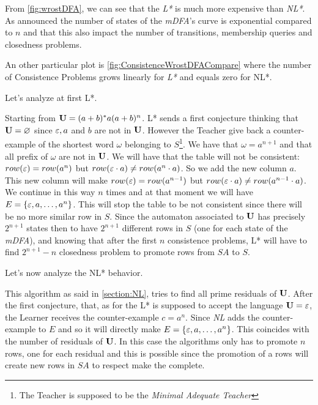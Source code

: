 From \cref{fig:wrostDFA}, we can see that the \textit{L*} is much more expensive than \textit{NL*}. As announced the number of states of the \textit{mDFA}'s curve is exponential compared to $n$ and that this also impact the number of transitions, membership queries and closedness problems.

An other particular plot is \cref{fig:ConsistenceWrostDFACompare} where the number of Consistence Problems grows linearly for \textit{L*} and equals zero for NL*.

Let's analyze at first L*.

Starting from $\mathbf{U} = (a+b)^*a(a+b)^n$. L* sends a first conjecture thinking that $\mathbf{U} = \varnothing$ since $\varepsilon, a$ and $b$ are not in $\mathbf{U}$. However the Teacher give back a counter-example of the shortest word $\omega$ belonging to $S$\footnote{The Teacher is supposed to be the \textit{Minimal Adequate Teacher}}. We have that $\omega = a^{n+1}$ and that all prefix of $\omega$ are not in $\mathbf{U}$. We will have that the table will not be consistent: $row(\varepsilon) = row(a^n)$ but $row(\varepsilon \cdot a) \neq row(a^n \cdot a)$. So we add the new column $a$. This new column will make $row(\varepsilon) = row(a^{n-1})$ but $row(\varepsilon \cdot a) \neq row(a^{n-1} \cdot a)$. We continue in this way $n$ times and at that moment we will have $E = \{\varepsilon, a, \dots, a^n\}$. This will stop the table to be not consistent since there will be no more similar row in $S$. Since the automaton associated to $\mathbf{U}$ has precisely $2^{n+1}$ states then to have $2^{n+1}$ different rows in $S$ (one for each state of the \textit{mDFA}), and knowing that after the first $n$ consistence problems, L* will have to find $2^{n+1}-n$ closedness problem to promote rows from $SA$ to $S$.

Let's now analyze the NL* behavior.

This algorithm as said in \cref{section:NL}, tries to find all prime residuals of $\mathbf{U}$. After the first conjecture, that, as for the L* is supposed to accept the language $\mathbf{U} = \varepsilon$, the Learner receives the counter-example $c = a^n$. Since \textit{NL} adds the counter-example to $E$ and so it will directly make $E = \{\varepsilon, a, \dots, a^n\}$. This coincides with the number of residuals of $\mathbf{U}$. In this case the  algorithms only has to promote $n$ rows, one for each residual and this is possible since the promotion of a rows will create new rows in $SA$ to respect make the \OT complete.


